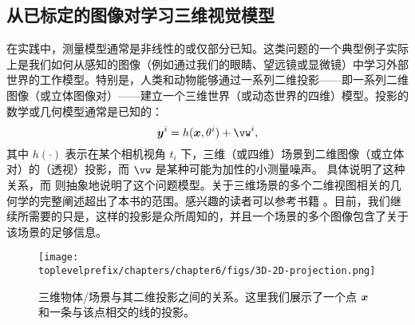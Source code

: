\documentclass[../../book-main_zh.tex]{subfiles}
\begin{document}



\subsection{从已标定的图像对学习三维视觉模型}
在实践中，测量模型通常是非线性的或仅部分已知。这类问题的一个典型例子实际上是我们如何从感知的图像（例如通过我们的眼睛、望远镜或显微镜）中学习外部世界的工作模型。特别是，人类和动物能够通过一系列二维投影——即一系列二维图像（或立体图像对）——建立一个三维世界（或动态世界的四维）模型。投影的数学或几何模型通常是已知的：
\begin{equation}
    \y^i = h(\x, \theta^i) +\vw^{i}, 
\end{equation}
其中 $h(\cdot)$ 表示在某个相机视角 $t_i$ 下，三维（或四维）场景到二维图像（或立体对）的（透视）投影，而 $\vw$ 是某种可能为加性的小测量噪声。 具体说明了这种关系，而  则抽象地说明了这个问题模型。关于三维场景的多个二维视图相关的几何学的完整阐述超出了本书的范围。感兴趣的读者可以参考书籍 \cite{MaY2003}。目前，我们继续所需要的只是，这样的投影是众所周知的，并且一个场景的多个图像包含了关于该场景的足够信息。
\begin{figure}[t]
    \centering
    \texttt{[image: \\toplevelprefix/chapters/chapter6/figs/3D-2D-projection.png]}
    \caption{三维物体/场景与其二维投影之间的关系。这里我们展示了一个点 $\bm{x}$ 和一条与该点相交的线的投影。}
    \label{fig:projection-2D}
\end{figure}
\end{document}
